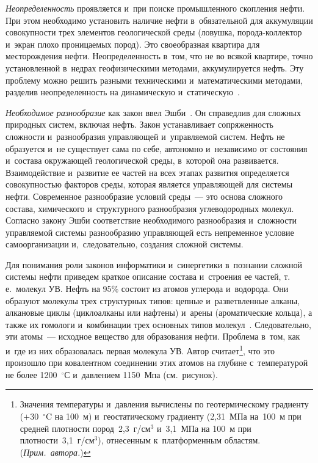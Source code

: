 \begin{multicols}{2}
    \textit{Неопределенность} проявляется и~при поиске промышленного 
скопления нефти. При этом необходимо установить наличие нефти 
в~обязательной для аккумуляции совокупности трех элементов геологической 
среды (ловушка, по\-ро\-да-кол\-лек\-тор и~экран плохо проницаемых пород). Это 
своеобразная квартира для месторождения нефти. Неопределенность в~том, что не 
во всякой квартире, точно установленной в~недрах геофизическими методами, 
аккумулируется нефть. Эту проблему можно решить разными техническими 
и~математическими методами, разделив неопределенность на динамическую 
и~статическую~\cite{4-s}. 
    
    \textit{Необходимое разнообразие} как закон ввел  
Эшби~\cite[с.~202--216]{5-s}. Он справедлив для сложных природных систем, 
включая нефть. Закон уста\-нав\-ли\-ва\-ет сопряженность сложности и~разнообразия 
управляющей и~управляемой систем. Нефть не образуется и~не существует сама 
по себе, автономно и~независимо от состояния и~состава окружающей 
геологической среды, в~которой она развивается. Взаимодействие и~развитие ее 
частей на всех этапах развития определяется совокупностью факторов среды, 
которая является управ\-ля\-ющей для сис\-те\-мы нефти. Современное разнообразие 
условий среды~--- это основа слож\-но\-го со\-ста\-ва, химического и~структурного 
разнообразия углеводородных молекул. Согласно закону Эшби соответствие 
необходимого разнообразия и~сложности управ\-ля\-емой сис\-те\-мы разнообразию 
управляющей есть непременное условие самоорганизации и,~следовательно, 
создания слож\-ной сис\-темы.
    
    Для понимания роли законов информатики и~синергетики в~познании 
сложной системы нефти приведем краткое описание состава и~стро\-ения ее частей, 
т.\,е.\ молекул УВ. Нефть на 95\% со\-сто\-ит из атомов углерода 
и~водорода. Они образуют молекулы трех структурных типов: цепные 
и~разветвленные алканы, алкановые циклы (циклоалканы или нафтены) и~арены 
(ароматические кольца), а также их гомологи и~комбинации трех основных типов 
молекул~\cite[с.~34--175]{6-s}. Следовательно, эти атомы~--- исходное вещество 
для образования нефти. Проб\-ле\-ма в~том, как и~где из них образовалась первая 
молекула УВ. Автор считает\footnote{Значения температуры и~давления вычислены по 
геотермическому градиенту ($+30$~$^\circ$C на 100~м) и~геостатическому градиенту (2,31~МПа 
на~100~м при средней плотности пород~2,3~г/см$^3$ и~3,1~МПа на 100~м при плотности~3,1~г/см$^3$), 
отнесенным к~платформенным областям. (\textit{Прим.\ автора.})}, что это произошло при 
ковалентном соединении этих атомов на глубине с~температурой не более 
1200~$^\circ$С и~давлением 1150~Мпа (см.\  рисунок). 
    

\end{multicols}
